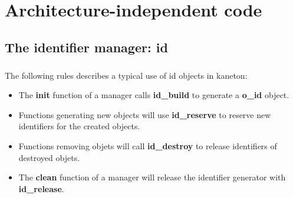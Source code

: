 
%
%

\chapter{Architecture-independent code}

\newpage

\section{The identifier manager: id}

\paragraph{}
The following rules describes a typical use of id objects in kaneton:

\begin{itemize}

\item The \textbf{init} function of a manager calls \textbf{id\_build}
to generate a \textbf{o\_id} object.

\item Functions generating new objects will use \textbf{id\_reserve} to
reserve new identifiers for the created objects.

\item Functions removing objets will call \textbf{id\_destroy} to release
identifiers of destroyed objets.

\item The \textbf{clean} function of a manager will release the identifier
generator with \textbf{id\_release}.

\end{itemize}


